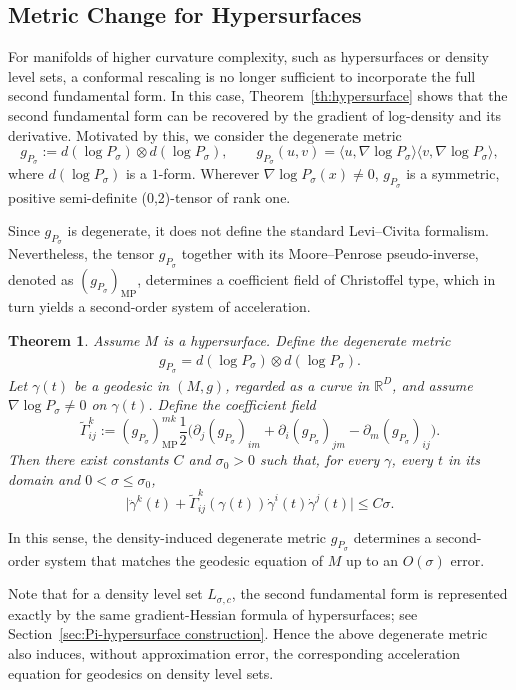 \documentclass[11pt]{article}
\theoremstyle{plain}
\newtheorem{theorem}{Theorem}[section]
\theoremstyle{definition}
\begin{document}
\subsection{Metric Change for Hypersurfaces}
For manifolds of higher curvature complexity, such as hypersurfaces or density level sets, a conformal rescaling is no longer sufficient to incorporate the full second fundamental form. In this case, Theorem~\ref{th:hypersurface} shows that the second fundamental form can be recovered by the gradient of log-density and its derivative. Motivated by this, we consider the degenerate metric
\[
g_{P_\sigma} := d(\log P_\sigma)\otimes d(\log P_\sigma),
\qquad 
g_{P_\sigma}(u,v) = \langle u, \nabla\log P_\sigma\rangle\langle v, \nabla\log P_\sigma\rangle,
\]
where $d(\log P_\sigma)$ is a $1$-form. 
Wherever $\nabla \log P_\sigma(x)\neq 0$, $g_{P_\sigma}$ is a symmetric, positive semi-definite (0,2)-tensor of rank one. 

Since $g_{P_\sigma}$ is degenerate, it does not define the standard Levi–Civita formalism. Nevertheless, the tensor $g_{P_\sigma}$ together with its Moore–Penrose pseudo-inverse, denoted as $(g_{P_\sigma})_{\mathrm{MP}}$, determines a coefficient field of Christoffel type, which in turn yields a second-order system of acceleration. 
\begin{theorem}\label{th:metric-hypersurface}
Assume $M$ is a hypersurface. Define the degenerate metric
\begin{align}\label{eq:metric-gradient}
g_{P_\sigma} = d(\log P_\sigma)\otimes d(\log P_\sigma).
\end{align}
Let $\gamma(t)$ be a geodesic in $(M,g)$, regarded as a curve in $\mathbb{R}^D$, and assume $\nabla\log P_\sigma\neq 0$ on $\gamma(t)$. Define the coefficient field
\[
\widetilde\Gamma^k_{ij}
:=
(g_{P_\sigma})_{\mathrm{MP}}^{mk}
\frac12
\big(
\partial_j(g_{P_\sigma})_{im}
+\partial_i(g_{P_\sigma})_{jm}
-\partial_m(g_{P_\sigma})_{ij}
\big).
\]
Then there exist constants $C$ and $\sigma_0>0$ such that, for every $\gamma$, every $t$ in its domain and $0<\sigma\le\sigma_0$,
\[
\big|\ddot\gamma^k(t)
+
\widetilde\Gamma^k_{ij}(\gamma(t))\dot\gamma^i(t)\dot\gamma^j(t) \big|
\le C\sigma.
\]
\end{theorem}
In this sense, the density-induced degenerate metric $g_{P_\sigma}$ determines a second-order system that matches the geodesic equation of $M$ up to an $O(\sigma)$ error.

Note that for a density level set $L_{\sigma,c}$, the second fundamental form is represented exactly by the same gradient-Hessian formula of hypersurfaces; see Section~\ref{sec:Pi-hypersurface construction}. Hence the above degenerate metric also induces, without approximation error, the corresponding acceleration equation for geodesics on density level sets.
\end{document}
